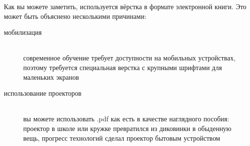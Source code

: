 \label{whyebook}

\noindent
Как вы можете заметить, используется вёрстка в формате электронной книги.
Это может быть объяснено несколькими причинами:

\begin{description}
\item[мобилизация]\ \\
современное обучение требует доступности на мобильных устройствах, поэтому
требуется специальная верстка с крупными шрифтами для маленьких экранов
\item[использование проекторов]\ \\
вы можете использовать .pdf как есть в качестве наглядного пособия: проектор в
школе или кружке превратился из диковинки в обыденную вещь, прогресс технологий
сделал проектор бытовым устройством
\end{description}
